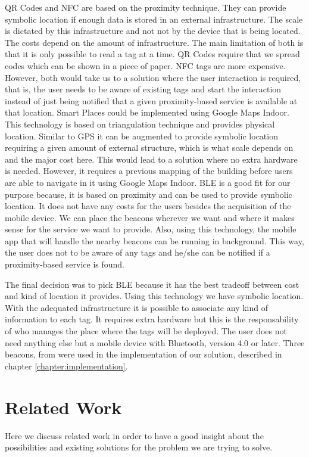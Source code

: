 \gls{QR} Codes and \gls{NFC} are based on the proximity technique.
They can provide symbolic location if enough data is stored in an external infrastructure.
The scale is dictated by this infrastructure and not not by the device that is being located.
The costs depend on the amount of infrastructure.
The main limitation of both is that it is only possible to read a tag at a time.
\gls{QR} Codes require that we spread codes which can be shown in a piece of paper.
\gls{NFC} tags are more expensive.
However, both would take us to a solution where the user interaction is required, that is, the user needs to be aware of existing tags and start the interaction instead of just being notified that a given proximity-based service is available at that location.
Smart Places could be implemented using Google Maps Indoor.
This technology is based on triangulation technique and provides physical location.
Similar to \gls{GPS} it can be augmented to provide symbolic location requiring a given amount of external structure, which is what scale depends on and the major cost here.
This would lead to a solution where no extra hardware is needed.
However, it requires a previous mapping of the building before users are able to navigate in it using Google Maps Indoor.
\gls{BLE} is a good fit for our purpose because, it is based on proximity and can be used to provide symbolic location.
It does not have any costs for the users besides the acquisition of the mobile device.
We can place the beacons wherever we want and where it makes sense for the service we want to provide.
Also, using this technology, the mobile app that will handle the nearby beacons can be running in background.
This way, the user does not to be aware of any tags and he/she can be notified if a proximity-based service is found.

The final decision was to pick \gls{BLE} because it has the best tradeoff between cost and kind of location it provides. Using this technology we have symbolic location. With the adequated infrastructure it is possible to associate any kind of information to each tag.
It requires extra hardware but this is the responsability of who manages the place where the tags will be deployed.
The user does not need anything else but a mobile device with Bluetooth, version 4.0 or later.
Three beacons, from  were used in the implementation of our solution, described in chapter \ref{chapter:implementation}.

\section{Related Work}
\label{sec:background_related_work}
Here we discuss related work in order to have a good insight about the possibilities and existing solutions for the problem we are trying to solve.


